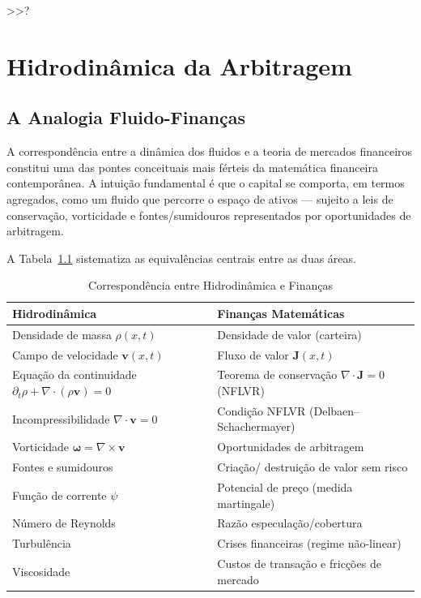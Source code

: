  >>?\chapter{Hidrodin\^amica da Arbitragem}

\section{A Analogia Fluido-Finan\c{c}as}

A correspond\^encia entre a din\^amica dos fluidos e a teoria de mercados financeiros constitui uma das pontes conceituais mais f\'erteis da matem\'atica financeira contempor\^anea. A intui\c{c}\~ao fundamental \'e que o capital se comporta, em termos agregados, como um fluido que percorre o espa\c{c}o de ativos --- sujeito a leis de conserva\c{c}\~ao, vorticidade e fontes/sumidouros representados por oportunidades de arbitragem.

A Tabela~\ref{tab:fluido-financas} sistematiza as equival\^encias centrais entre as duas \'areas.

\begin{table}[htbp]
\centering
\caption{Correspond\^encia entre Hidrodin\^amica e Finan\c{c}as}
\label{tab:fluido-financas}
\begin{tabular}{p{5cm}|p{5cm}}
\toprule
\textbf{Hidrodin\^amica} & \textbf{Finan\c{c}as Matem\'aticas} \\
\midrule
Densidade de massa $\rho(x,t)$ & Densidade de valor (carteira) \\
Campo de velocidade $\mathbf{v}(x,t)$ & Fluxo de valor $\mathbf{J}(x,t)$ \\
Equa\c{c}\~ao da continuidade $\partial_t \rho + \nabla\cdot(\rho\mathbf{v}) = 0$ & Teorema de conserva\c{c}\~ao $\nabla\cdot \mathbf{J} = 0$ (NFLVR) \\
Incompressibilidade $\nabla\cdot\mathbf{v}=0$ & Condi\c{c}\~ao NFLVR (Delbaen--Schachermayer) \\
Vorticidade $\bm{\omega} = \nabla\times\mathbf{v}$ & Oportunidades de arbitragem \\
Fontes e sumidouros & Cria\c{c}\~ao/ destrui\c{c}\~ao de valor sem risco \\
Fun\c{c}\~ao de corrente $\psi$ & Potencial de pre\c{c}o (medida martingale) \\
N\'umero de Reynolds & Raz\~ao especula\c{c}\~ao/cobertura \\
Turbul\^encia & Crises financeiras (regime n\~ao-linear) \\
Viscosidade & Custos de transa\c{c}\~ao e fric\c{c}\~oes de mercado \\
\bottomrule
\end{tabular}
\end{table}

